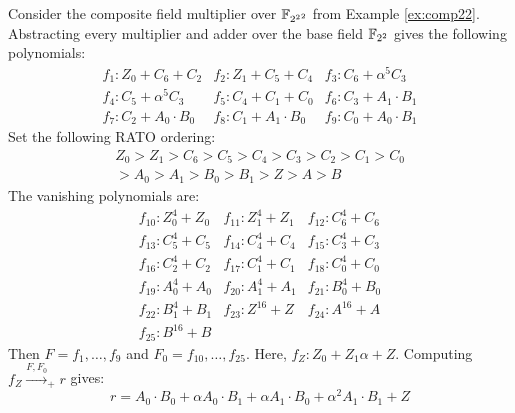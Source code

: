 \begin{Example}
Consider the composite field multiplier over ${\mathbb{F}}_{{2^2}^2}$ from Example \ref{ex:comp22}.
Abstracting every multiplier and adder over the base field ${\mathbb{F}}_{2^2}$ gives the following
polynomials:
\begin{eqnarray}
f_1: Z_0+C_6+C_2      & f_2: Z_1+C_5+C_4      & f_3: C_6+\alpha^5C_3 \nonumber \\
f_4: C_5+\alpha^5C_3  & f_5: C_4+C_1+C_0      & f_6: C_3+A_1\cdot B_1 \nonumber \\
f_7: C_2+A_0\cdot B_0 & f_8: C_1+A_1\cdot B_0 & f_9: C_0+A_0\cdot B_1 
\end{eqnarray}
Set the following RATO ordering:
\begin{eqnarray}
Z_0 > Z_1 > C_6 > C_5 > C_4 > C_3 > C_2 > C_1 > C_0 \nonumber \\
> A_0 > A_1 > B_0 > B_1 > Z > A > B
\end{eqnarray}
The vanishing polynomials are:
\begin{eqnarray}
f_{10}: Z_0^4+Z_0 & f_{11}: Z_1^4+Z_1 & f_{12}: C_6^4+C_6 \nonumber \\
f_{13}: C_5^4+C_5 & f_{14}: C_4^4+C_4 & f_{15}: C_3^4+C_3 \nonumber \\
f_{16}: C_2^4+C_2 & f_{17}: C_1^4+C_1 & f_{18}: C_0^4+C_0 \nonumber \\
f_{19}: A_0^4+A_0 & f_{20}: A_1^4+A_1 & f_{21}: B_0^4+B_0 \nonumber \\
f_{22}: B_1^4+B_1 & f_{23}: Z^{16}+Z  & f_{24}: A^{16}+A \nonumber \\
f_{25}: B^{16}+B
\end{eqnarray}
Then $F=f_1,\dots,f_9$ and 
$F_0=f_{10},\dots,f_{25}$.
Here, $f_Z: Z_0+Z_1\alpha+Z$. Computing $f_Z\xrightarrow{F,F_0}_+ r$ gives:
\begin{equation}
r= A_0\cdot B_0+\alpha A_0\cdot B_1+\alpha A_1\cdot B_0+\alpha^2A_1\cdot B_1+Z
\end{equation}


\end{Example}
